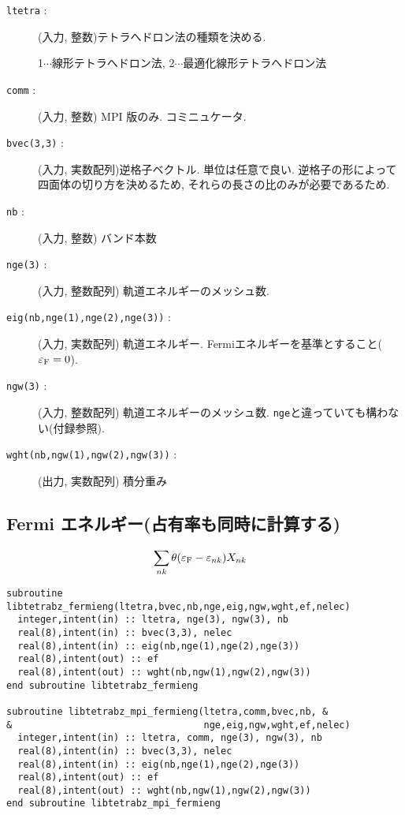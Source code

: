 \documentclass[12pt]{jarticle}
\begin{document}
\begin{description}
\item[\texttt{ltetra} :] (入力, 整数)テトラへドロン法の種類を決める. 

    1$\cdots$線形テトラへドロン法, 
    2$\cdots$最適化線形テトラへドロン法

\item[\texttt{comm} :] (入力, 整数) MPI 版のみ. コミニュケータ. 
\item[\texttt{bvec(3,3)} :] (入力, 実数配列)逆格子ベクトル. 
  単位は任意で良い. 逆格子の形によって四面体の切り方を決めるため, それらの長さの比のみが必要であるため.
\item[\texttt{nb} :] (入力, 整数) バンド本数
\item[\texttt{nge(3)} :] (入力, 整数配列) 軌道エネルギーのメッシュ数. 
\item[\texttt{eig(nb,nge(1),nge(2),nge(3))} :] (入力, 実数配列) 軌道エネルギー. 
  Fermiエネルギーを基準とすること($\varepsilon_{\rm F} = 0$).
\item[\texttt{ngw(3)} :] (入力, 整数配列) 軌道エネルギーのメッシュ数. 
  \verb|nge|と違っていても構わない(付録参照).
\item[\texttt{wght(nb,ngw(1),ngw(2),ngw(3))} :] (出力, 実数配列) 積分重み
\end{description}

\newpage

\subsection{Fermi エネルギー(占有率も同時に計算する)}

\begin{align}
&\sum_{n k} \theta(\varepsilon_{\rm F} - \varepsilon_{n k}) X_{n k}
\end{align}

\begin{verbatim}
subroutine libtetrabz_fermieng(ltetra,bvec,nb,nge,eig,ngw,wght,ef,nelec)
  integer,intent(in) :: ltetra, nge(3), ngw(3), nb
  real(8),intent(in) :: bvec(3,3), nelec
  real(8),intent(in) :: eig(nb,nge(1),nge(2),nge(3))
  real(8),intent(out) :: ef
  real(8),intent(out) :: wght(nb,ngw(1),ngw(2),ngw(3))
end subroutine libtetrabz_fermieng

subroutine libtetrabz_mpi_fermieng(ltetra,comm,bvec,nb, &
&                                  nge,eig,ngw,wght,ef,nelec)
  integer,intent(in) :: ltetra, comm, nge(3), ngw(3), nb
  real(8),intent(in) :: bvec(3,3), nelec
  real(8),intent(in) :: eig(nb,nge(1),nge(2),nge(3))
  real(8),intent(out) :: ef
  real(8),intent(out) :: wght(nb,ngw(1),ngw(2),ngw(3))
end subroutine libtetrabz_mpi_fermieng
\end{verbatim}
\end{document}
